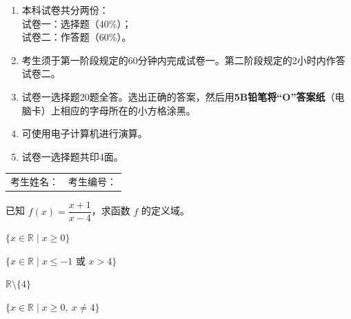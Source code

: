 \documentclass[12pt,a4paper]{exam-zh}
\begin{document}
\begin{enumerate}[label=\arabic*、,leftmargin=2em,itemsep=0.65em]
  \item 本科试卷共分两份：\\
  试卷一：选择题（40\%）；\\
  试卷二：作答题（60\%）。

  \item 考生须于第一阶段规定的60分钟内完成试卷一。第二阶段规定的2小时内作答试卷二。

  \item 试卷一选择题20题全答。选出正确的答案，然后用\textbf{5B铅笔将“O”答案纸}（电脑卡）上相应的字母所在的小方格涂黑。

  \item 可使用电子计算机进行演算。

  \item 试卷一选择题共印4面。
\end{enumerate}

\vspace{2.0em}

\begin{center}
  {\setlength{\fboxrule}{1.2pt}}
\end{center}

\vfill

\begin{tabular*}{\linewidth}{@{\extracolsep{\fill}}ll}
考生姓名：\underline{\hspace{4.2cm}} & 考生编号：\underline{\hspace{4.0cm}}
\end{tabular*}



\begin{question}
    已知 $f(x)=\dfrac{x+1}{x-4}$，求函数 $f$ 的定义域。\paren[C]
    \begin{choices}
        \item $\{x\in\mathbb{R}\mid x\ge 0\}$
        \item $\{x\in\mathbb{R}\mid x\le -1\text{ 或 }x>4\}$
        \item $\mathbb{R}\setminus\{4\}$
        \item $\{x\in\mathbb{R}\mid x\ge 0,\ x\ne 4\}$
    \end{choices}
\end{question}
\end{document}
